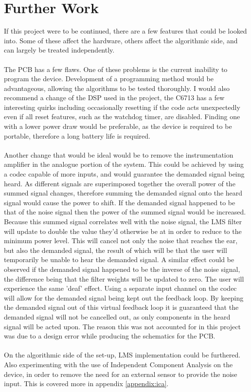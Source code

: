 \section{Further Work}

If this project were to be continued, there are a few features that could be looked into.
Some of these affect the hardware, others affect the algorithmic side, and can largely be treated independently.
\\
\\
The PCB has a few flaws.
One of these problems is the current inability to program the device.
Development of a programming method would be advantageous, allowing the algorithms to be tested thoroughly.
I would also recommend a change of the DSP used in the project, the C6713 has a few interesting quirks including occasionally resetting if the code acts unexpectedly even if all reset features, such as the watchdog timer, are disabled.
Finding one with a lower power draw would be preferable, as the device is required to be portable, therefore a long battery life is required.
\\
\\
Another change that would be ideal would be to remove the instrumentation amplifier in the analogue portion of the system.
This could be achieved by using a codec capable of more inputs, and would guarantee the demanded signal being heard.
As different signals are superimposed together the overall power of the summed signal changes, therefore summing the demanded signal onto the heard signal would cause the power to shift.
If the demanded signal happened to be that of the noise signal then the power of the summed signal would be increased.
Because this summed signal correlates well with the noise signal, the LMS filter will update to double the value they'd otherwise be at in order to reduce to the minimum power level.
This will cancel not only the noise that reaches the ear, but also the demanded signal, the result of which will be that the user will temporarily be unable to hear the demanded signal.
A similar effect could be observed if the demanded signal happened to be the inverse of the noise signal, the difference being that the filter weights will be updated to zero.
The user will experience the same 'deaf' effect.
Using a separate input channel on the codec will allow for the demanded signal being kept out the feedback loop.
By keeping the demanded signal out of this virtual feedback loop it is guaranteed that the demanded signal will not be cancelled out, as only components in the heard signal will be acted upon.
The reason this was not accounted for in this project was due to a design error while producing the schematics for the PCB.
\label{text:virtualfeedbackassumption}
\\
\\
On the algorithmic side of the set-up, LMS implementation could be furthered.
Also experimenting with the use of Independent Component Analysis on the device, in order to remove the need for an external sensor to provide the noise input.
This is covered more in appendix \ref{appendix:ica}.
